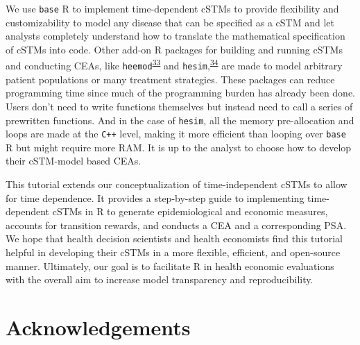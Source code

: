 \documentclass[
]{article}
\begin{document}
We use \texttt{base} R to implement time-dependent cSTMs to provide flexibility and customizability to model any disease that can be specified as a cSTM and let analysts completely understand how to translate the mathematical specification of cSTMs into code. Other add-on R packages for building and running cSTMs and conducting CEAs, like \texttt{heemod}\textsuperscript{\protect\hyperlink{ref-Filipovic-Pierucci2017}{33}} and \texttt{hesim},\textsuperscript{\protect\hyperlink{ref-Incerti2021}{34}} are made to model arbitrary patient populations or many treatment strategies. These packages can reduce programming time since much of the programming burden has already been done. Users don't need to write functions themselves but instead need to call a series of prewritten functions. And in the case of \texttt{hesim}, all the memory pre-allocation and loops are made at the \texttt{C++} level, making it more efficient than looping over \texttt{base} R but might require more RAM. It is up to the analyst to choose how to develop their cSTM-model based CEAs.

This tutorial extends our conceptualization of time-independent cSTMs to allow for time dependence. It provides a step-by-step guide to implementing time-dependent cSTMs in R to generate epidemiological and economic measures, accounts for transition rewards, and conducts a CEA and a corresponding PSA. We hope that health decision scientists and health economists find this tutorial helpful in developing their cSTMs in a more flexible, efficient, and open-source manner. Ultimately, our goal is to facilitate R in health economic evaluations with the overall aim to increase model transparency and reproducibility.

\hypertarget{acknowledgements}{%
\section{Acknowledgements}\label{acknowledgements}}
\end{document}
